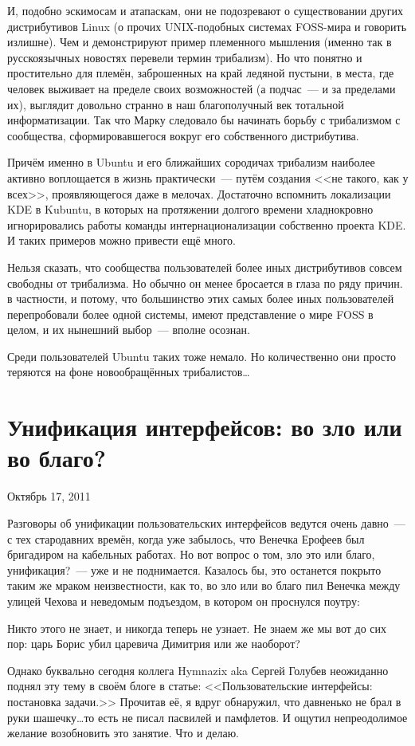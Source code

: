 И, подобно эскимосам и атапаскам, они не подозревают о существовании других дистрибутивов Linux (о прочих UNIX-подобных системах FOSS-мира и говорить излишне). Чем и демонстрируют пример племенного мышления (именно так в русскоязычных новостях перевели термин трибализм). Но что понятно и простительно для племён, заброшенных на край ледяной пустыни, в места, где человек выживает на пределе своих возможностей (а подчас~--- и за пределами их), выглядит довольно странно в наш благополучный век тотальной информатизации. Так что Марку следовало бы начинать борьбу с трибализмом с сообщества, сформировавшегося вокруг его собственного дистрибутива.

Причём именно в Ubuntu и его ближайших сородичах трибализм наиболее активно воплощается в жизнь практически~--- путём создания <<не такого, как у всех>>, проявляющегося даже в мелочах. Достаточно вспомнить локализации KDE в Kubuntu, в которых на протяжении долгого времени хладнокровно игнорировались работы команды интернационализации собственно проекта KDE. И таких примеров можно привести ещё много.

Нельзя сказать, что сообщества пользователей более иных дистрибутивов совсем свободны от трибализма. Но обычно он менее бросается в глаза по ряду причин. в частности, и потому, что большинство этих самых более иных пользователей перепробовали более одной системы, имеют представление о мире FOSS в целом, и их нынешний выбор~--- вполне осознан.

Среди пользователей Ubuntu таких тоже немало. Но количественно они просто теряются на фоне новообращённых трибалистов\dots

\section{Унификация интерфейсов: во зло или во благо?} 
\begin{timeline}Октябрь 17, 2011\end{timeline}

Разговоры об унификации пользовательских интерфейсов ведутся очень давно~--- с тех стародавних времён, когда уже забылось, что Венечка Ерофеев был бригадиром на кабельных работах. Но вот вопрос о том, зло это или благо, унификация?~--- уже и не поднимается. Казалось бы, это останется покрыто таким же мраком неизвестности, как то, во зло или во благо пил Венечка между улицей Чехова и неведомым подъездом, в котором он проснулся поутру:

\begin{shadequote}{}
Никто этого не знает, и никогда теперь не узнает. Не знаем же мы вот до сих пор: царь Борис убил царевича Димитрия или же наоборот?
\end{shadequote}
Однако буквально сегодня коллега Hymnazix aka Сергей Голубев неожиданно поднял эту тему в своём блоге в статье: <<Пользовательские интерфейсы: постановка задачи.>> Прочитав её, я вдруг обнаружил, что давненько не брал в руки шашечку\dots то есть не писал пасвилей и памфлетов. И ощутил непреодолимое желание возобновить это занятие. Что и делаю.

